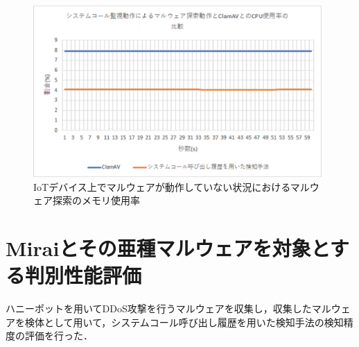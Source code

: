 \begin{figure}[h]
        \centering
           \includegraphics[width=110mm]{figures/strace_mem.eps}
        \caption{IoTデバイス上でマルウェアが動作していない状況におけるマルウェア探索のメモリ使用率}
        \label{fig:strace_mem}
\end{figure}
\newpage
\section{Miraiとその亜種マルウェアを対象とする判別性能評価}
ハニーポットを用いてDDoS攻撃を行うマルウェアを収集し，収集したマルウェアを検体として用いて，システムコール呼び出し履歴を用いた検知手法の検知精度の評価を行った．

